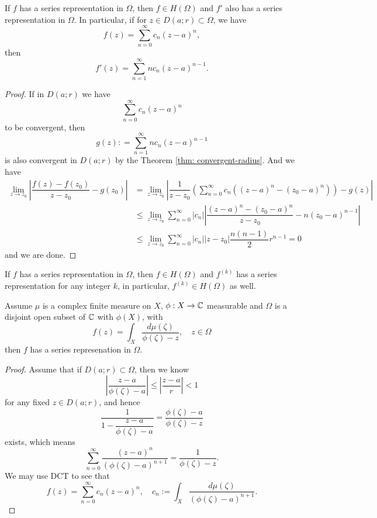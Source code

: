 \begin{theorem}
    If $f$ has a series representation in $\Omega$, then $f\in H(\Omega)$ and $f'$ also has a series representation in $\Omega$. In particular, if for $z\in D(a;r) \subset \Omega$, we have
    \[
    f(z) = \sum\limits_{n=0}^{\infty} c_n(z-a)^n,
    \]
    then
    \[
    f'(z) = \sum\limits_{n=1}^{\infty}nc_n(z-a)^{n-1}.
    \]
\end{theorem}
\begin{proof}
    If in $D(a;r)$ we have
    \[\sum\limits_{n=0}^{\infty} c_n(z-a)^n\]
    to be convergent, then
    \[
    g(z): = \sum\limits_{n=1}^{\infty}nc_n(z-a)^{n-1}
    \]
    is also convergent in $D(a;r)$ by  the Theorem \ref{thm: convergent-radius}. And we have
    \[
    \begin{aligned}
        \lim_{z\to z_0} \left|\dfrac{f(z) - f(z_0)}{z-z_0} - g(z_0)\right| & = \lim_{z\to z_0}\left|\dfrac{1}{z-z_0}\left(\sum\limits_{n=0}^{\infty} c_n\left((z-a)^n-(z_0-a)^n\right)\right) -g(z)\right|\\
        &\leq \lim_{z\to z_0}\sum\limits_{n=0}^{\infty}|c_n|\left|\dfrac{(z-a)^n - (z_0-a)^n}{z-z_0} -n(z_0-a)^{n-1}\right| \\
        &\leq \lim_{z\to z_0}\sum\limits_{n=0}^{\infty}|c_n||z-z_0|\dfrac{n(n-1)}{2}r^{n-1} = 0
    \end{aligned}
    \]
    and we are done.
\end{proof}

\begin{corollary}
    If $f$ has a series representation in $\Omega$, then $f\in H(\Omega)$ and $f^{(k)}$ has a series representation for any integer $k$, in particular, $f^{(k)} \in H(\Omega)$ as well.
\end{corollary}

\begin{theorem}
\label{thm: route-integral-holomorphic}
    Assume $\mu$ is a complex finite measure on $X$, $\phi:X \to \mathbb{C}$ measurable and $\Omega$ is a disjoint open subset of $\mathbb{C}$ with $\phi(X)$, with
    \[
    f(z) = \int_X \dfrac{d\mu(\zeta)}{\phi(\zeta)- z}, \quad z\in \Omega
    \]
    then $f$ has a series represenation in $\Omega$.
\end{theorem}
\begin{proof}
    Assume that if $D(a;r) \subset \Omega$, then we know
    \[
    \left|\dfrac{z-a}{\phi(\zeta) - a}\right| \leq \left|\dfrac{z-a}{r}\right| < 1
    \]
    for any fixed $z\in D(a;r)$, and hence
    \[
    \dfrac{1}{1-\dfrac{z-a}{\phi(\zeta) - a}} = \dfrac{\phi(\zeta) -a }{\phi(\zeta) - z} 
    \]
    exists, which means 
    \[
    \sum\limits_{n=0}^{\infty}\dfrac{(z-a)^n}{(\phi(\zeta)-a)^{n+1}} = \dfrac{1}{\phi(\zeta) - z}.
    \]
    We may use DCT to see that
    \[
    f(z) = \sum\limits_{n=0}^{\infty} c_n(z-a)^n,\quad c_n:= \int_X \dfrac{d\mu(\zeta)}{(\phi(\zeta) -a)^{n+1}}.
    \]
\end{proof}

